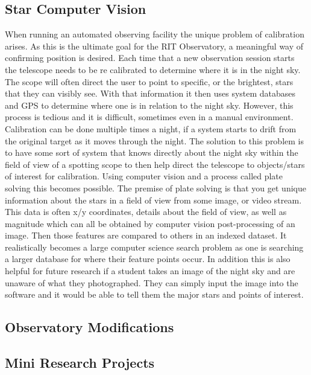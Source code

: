 \documentclass[conference]{IEEEtran} %
\begin{document}
  \subsection{Star Computer Vision}
\label{subsec:star}
 When running an automated observing facility the unique problem of calibration arises. As this is the ultimate goal for the RIT Observatory, a meaningful way of confirming position is desired. Each time that a new observation session starts the telescope needs to be re calibrated to determine where it is in the night sky. The scope will often direct the user to point to specific, or the brightest, stars that they can visibly see.  With that information it then uses system databases and GPS to determine where one is in relation to the night sky.  However, this process is tedious and it is difficult, sometimes even in a manual environment. Calibration can be done multiple times a night, if a system starts to drift from the original target as it moves through the night. The solution to this problem is to have some sort of system that knows directly about the night sky within the field of view of a spotting scope to then help direct the telescope to objects/stars of interest for calibration.  Using computer vision and a process called plate solving this becomes possible.
The premise of plate solving is that you get unique information about the stars in a field of view from some image, or video stream.  This data is often x/y coordinates, details about the field of view, as well as magnitude which can all be obtained by computer vision post-processing of an image.  Then those features are compared to others in an indexed dataset.  It realistically becomes a large computer science search problem as one is searching a larger database for where their feature points occur.
In addition this is also helpful for future research if a student takes an image of the night sky and are unaware of what they photographed.  They can simply input the image into the software and it would be able to tell them the major stars and points of interest.

\subsection{Observatory Modifications}
\label{subsec:obs}


  \subsection{Mini Research Projects}
\label{subsec:radio}
  
\end{document}
